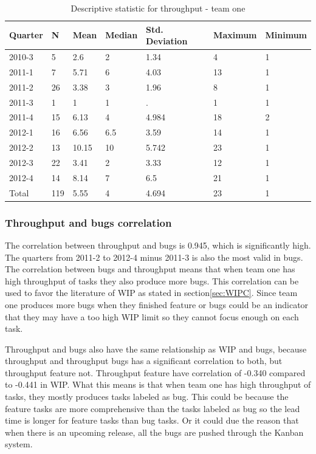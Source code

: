 \documentclass[UKenglish]{ifimaster}  %
\begin{document}
    \begin{table}[!htbp]
 \begin{tabular}{ | l | l | l | l | l | l | l | }
\hline
	 Quarter & N & Mean & Median & Std. Deviation & Maximum & Minimum \\ \hline
	 2010-3 & 5 & 2.6 & 2 & 1.34 & 4 & 1 \\ \hline
	 2011-1 & 7 & 5.71 & 6 & 4.03 & 13 & 1 \\ \hline
	 2011-2 & 26 & 3.38 & 3 & 1.96 & 8 & 1 \\ \hline
	 2011-3 & 1 & 1 & 1 & . & 1 & 1 \\ \hline
	 2011-4 & 15 & 6.13 & 4 & 4.984 & 18 & 2 \\ \hline
	 2012-1 & 16 & 6.56 & 6.5 & 3.59 & 14 & 1 \\ \hline
	 2012-2 & 13 & 10.15 & 10 & 5.742 & 23 & 1 \\ \hline
	 2012-3 & 22 & 3.41 & 2 & 3.33 & 12 & 1 \\ \hline
	 2012-4 & 14 & 8.14 & 7 & 6.5 & 21 & 1 \\ \hline
	 Total & 119 & 5.55 & 4 & 4.694 & 23 & 1 \\ \hline
	 \end{tabular}
	 \caption{Descriptive statistic for throughput - team one }
	 \label{DS:T:1:2}
	 \end{table}%
	 
\subsubsection{Throughput and bugs correlation}
The correlation between throughput and bugs is 0.945, which is significantly high. 
The quarters from 2011-2 to 2012-4 minus 2011-3 is also the most valid in bugs. The correlation between bugs and throughput means that when team one has high throughput of tasks they also produce more bugs. This correlation can be used to favor the literature of WIP as stated in section\ref{sec:WIPC}. Since team one produces more bugs when they finished feature or bugs could be an indicator that they may have a too high WIP limit so they cannot focus enough on each task.

Throughput and bugs also have the same relationship as WIP and bugs, because throughput and throughput bugs has a significant correlation to both, but throughput feature not. Throughput feature have correlation of -0.340 compared to -0.441 in WIP. What this means is that when team one has high throughput of tasks, they mostly produces tasks labeled as bug.  This could be because the feature tasks are more comprehensive than the tasks labeled as bug so the lead time is longer for feature tasks than bug tasks. Or it could due the reason that when there is an upcoming release, all the bugs are pushed through the Kanban system. 
\end{document}
